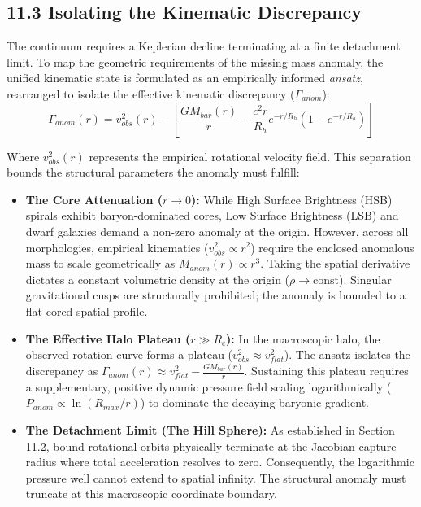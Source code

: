 \subsection*{11.3 Isolating the Kinematic Discrepancy} 
The continuum requires a Keplerian decline terminating at a finite detachment limit. To map the geometric requirements of the missing mass anomaly, the unified kinematic state is formulated as an empirically informed \textit{ansatz}, rearranged to isolate the effective kinematic discrepancy ($\Gamma_{anom}$): 
\begin{equation} 
    \Gamma_{anom}(r) = v_{obs}^2(r) - \left[ \frac{GM_{bar}(r)}{r} - \frac{c^2 r}{R_h} e^{-r/R_h} \left(1 - e^{-r/R_h}\right) \right]
\end{equation}

Where $v_{obs}^2(r)$ represents the empirical rotational velocity field. This separation bounds the structural parameters the anomaly must fulfill: 
\begin{itemize} 
    \item \textbf{The Core Attenuation ($r \to 0$):} While High Surface Brightness (HSB) spirals exhibit baryon-dominated cores, Low Surface Brightness (LSB) and dwarf galaxies demand a non-zero anomaly at the origin. However, across all morphologies, empirical kinematics ($v_{obs}^2 \propto r^2$) require the enclosed anomalous mass to scale geometrically as $M_{anom}(r) \propto r^3$. Taking the spatial derivative dictates a constant volumetric density at the origin ($\rho \to \text{const}$). Singular gravitational cusps are structurally prohibited; the anomaly is bounded to a flat-cored spatial profile. 
    \item \textbf{The Effective Halo Plateau ($r \gg R_c$):} In the macroscopic halo, the observed rotation curve forms a plateau ($v_{obs}^2 \approx v_{flat}^2$). The ansatz isolates the discrepancy as $\Gamma_{anom}(r) \approx v_{flat}^2 - \frac{GM_{bar}(r)}{r}$. Sustaining this plateau requires a supplementary, positive dynamic pressure field scaling logarithmically ($P_{anom} \propto \ln(R_{max}/r)$) to dominate the decaying baryonic gradient. 
    \item \textbf{The Detachment Limit (The Hill Sphere):} As established in Section 11.2, bound rotational orbits physically terminate at the Jacobian capture radius where total acceleration resolves to zero. Consequently, the logarithmic pressure well cannot extend to spatial infinity. The structural anomaly must truncate at this macroscopic coordinate boundary.
\end{itemize}


